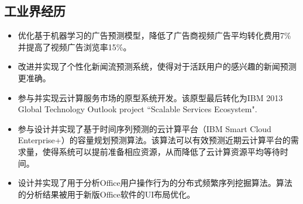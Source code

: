 \documentclass[11pt,a4paper,sans]{moderncv}
\begin{document}
\subsection{工业界经历}
{
\begin{itemize}\itemsep 0.05in
\item 优化基于机器学习的广告预测模型，降低了广告商视频广告平均转化费用7\%并提高了视频广告浏览率15\%。
\end{itemize}
}
{
\begin{itemize}\itemsep 0.05in
\item 
改进并实现了个性化新闻流预测系统，使得对于活跃用户的感兴趣的新闻预测更准确。
\end{itemize}
} %
{
\begin{itemize}\itemsep 0.05in
\item 参与并实现云计算服务市场的原型系统开发。该原型最后转化为IBM 2013 Global Technology Outlook project ``Scalable Services Ecosystem".
\item 参与设计并实现了基于时间序列预测的云计算平台（IBM Smart Cloud Enterprise+）的容量规划预测算法。该算法可以有效预测近期云计算平台的需求量，使得系统可以提前准备相应资源，从而降低了云计算资源平均等待时间。
\end{itemize}
} %
{
\begin{itemize}
\item 设计并实现了用于分析Office用户操作行为的分布式频繁序列挖掘算法。算法的分析结果被用于新版Office软件的UI布局优化。
\end{itemize}
} %
\end{document}
